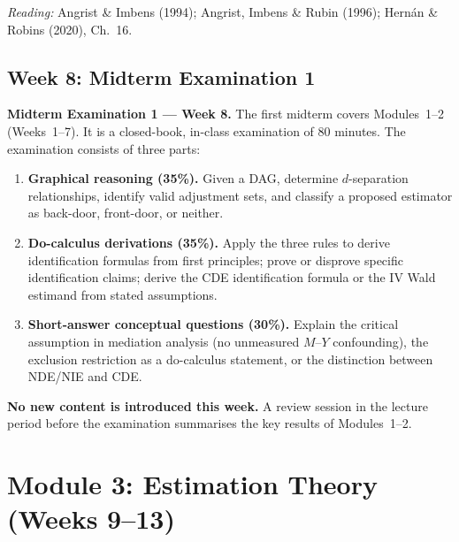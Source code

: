\documentclass[12pt]{article}
\begin{document}
\noindent\textit{Reading:} Angrist \& Imbens (1994);
Angrist, Imbens \& Rubin (1996);
Hern\'an \& Robins (2020), Ch.~16.

\subsection*{Week 8: Midterm Examination 1}

\begin{exambox}
\noindent\textbf{\color{darkblue}Midterm Examination 1 --- Week 8.}
The first midterm covers Modules~1--2 (Weeks~1--7).  It is a closed-book,
in-class examination of 80 minutes.  The examination consists of three
parts:

\begin{enumerate}
  \item \textbf{Graphical reasoning (35\%).}
    Given a DAG, determine $d$-separation relationships, identify valid
    adjustment sets, and classify a proposed estimator as back-door,
    front-door, or neither.

  \item \textbf{Do-calculus derivations (35\%).}
    Apply the three rules to derive identification formulas from first
    principles; prove or disprove specific identification claims; derive
    the CDE identification formula or the IV Wald estimand from stated
    assumptions.

  \item \textbf{Short-answer conceptual questions (30\%).}
    Explain the critical assumption in mediation analysis (no unmeasured
    $M$--$Y$ confounding), the exclusion restriction as a do-calculus
    statement, or the distinction between NDE/NIE and CDE.
\end{enumerate}

\noindent\textbf{No new content is introduced this week.}
A review session in the lecture period before the examination summarises
the key results of Modules~1--2.
\end{exambox}

\section{Module 3: Estimation Theory (Weeks 9--13)}
\end{document}
